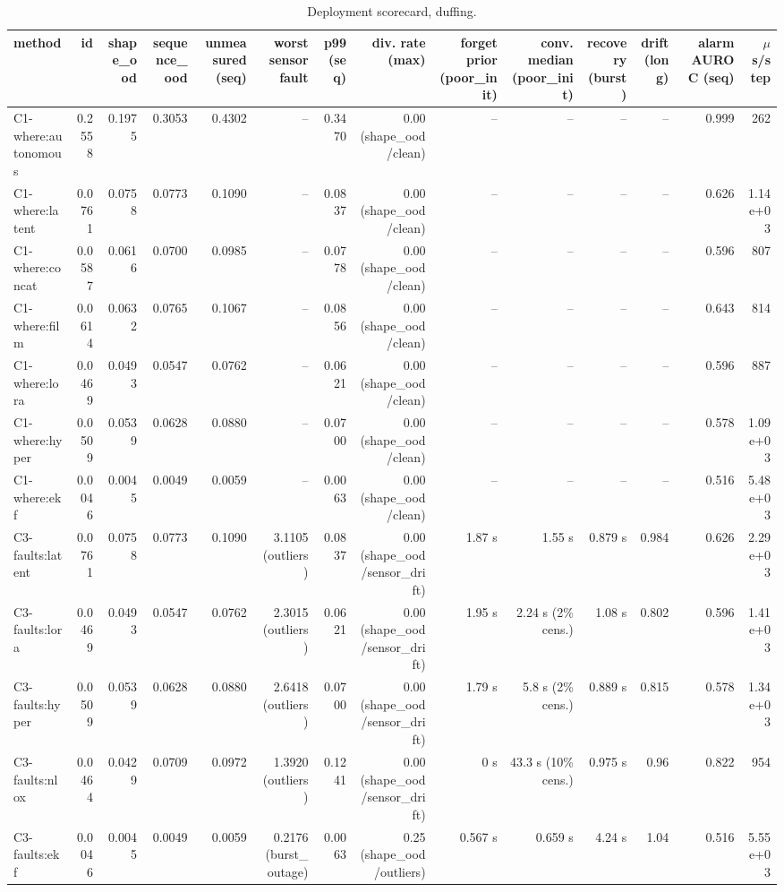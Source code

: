 \begin{table}[t]
\centering
\scriptsize
\caption{Deployment scorecard, duffing.}
\begin{tabular}{lrrrrrrrrrrrrr}
\toprule
method & id & shape\_ood & sequence\_ood & unmeasured (seq) & worst sensor fault & p99 (seq) & div. rate (max) & forget prior (poor\_init) & conv. median (poor\_init) & recovery (burst) & drift (long) & alarm AUROC (seq) & $\mu$s/step \\
\midrule
C1-where:autonomous & 0.2558 & 0.1975 & 0.3053 & 0.4302 & – & 0.3470 & 0.00 (shape\_ood/clean) & – & – & – & – & 0.999 & 262 \\
C1-where:latent & 0.0761 & 0.0758 & 0.0773 & 0.1090 & – & 0.0837 & 0.00 (shape\_ood/clean) & – & – & – & – & 0.626 & 1.14e+03 \\
C1-where:concat & 0.0587 & 0.0616 & 0.0700 & 0.0985 & – & 0.0778 & 0.00 (shape\_ood/clean) & – & – & – & – & 0.596 & 807 \\
C1-where:film & 0.0614 & 0.0632 & 0.0765 & 0.1067 & – & 0.0856 & 0.00 (shape\_ood/clean) & – & – & – & – & 0.643 & 814 \\
C1-where:lora & 0.0469 & 0.0493 & 0.0547 & 0.0762 & – & 0.0621 & 0.00 (shape\_ood/clean) & – & – & – & – & 0.596 & 887 \\
C1-where:hyper & 0.0509 & 0.0539 & 0.0628 & 0.0880 & – & 0.0700 & 0.00 (shape\_ood/clean) & – & – & – & – & 0.578 & 1.09e+03 \\
C1-where:ekf & 0.0046 & 0.0045 & 0.0049 & 0.0059 & – & 0.0063 & 0.00 (shape\_ood/clean) & – & – & – & – & 0.516 & 5.48e+03 \\
C3-faults:latent & 0.0761 & 0.0758 & 0.0773 & 0.1090 & 3.1105 (outliers) & 0.0837 & 0.00 (shape\_ood/sensor\_drift) & 1.87 s & 1.55 s & 0.879 s & 0.984 & 0.626 & 2.29e+03 \\
C3-faults:lora & 0.0469 & 0.0493 & 0.0547 & 0.0762 & 2.3015 (outliers) & 0.0621 & 0.00 (shape\_ood/sensor\_drift) & 1.95 s & 2.24 s (2\% cens.) & 1.08 s & 0.802 & 0.596 & 1.41e+03 \\
C3-faults:hyper & 0.0509 & 0.0539 & 0.0628 & 0.0880 & 2.6418 (outliers) & 0.0700 & 0.00 (shape\_ood/sensor\_drift) & 1.79 s & 5.8 s (2\% cens.) & 0.889 s & 0.815 & 0.578 & 1.34e+03 \\
C3-faults:nlox & 0.0464 & 0.0429 & 0.0709 & 0.0972 & 1.3920 (outliers) & 0.1241 & 0.00 (shape\_ood/sensor\_drift) & 0 s & 43.3 s (10\% cens.) & 0.975 s & 0.96 & 0.822 & 954 \\
C3-faults:ekf & 0.0046 & 0.0045 & 0.0049 & 0.0059 & 0.2176 (burst\_outage) & 0.0063 & 0.25 (shape\_ood/outliers) & 0.567 s & 0.659 s & 4.24 s & 1.04 & 0.516 & 5.55e+03 \\

\end{tabular}
\end{table}
